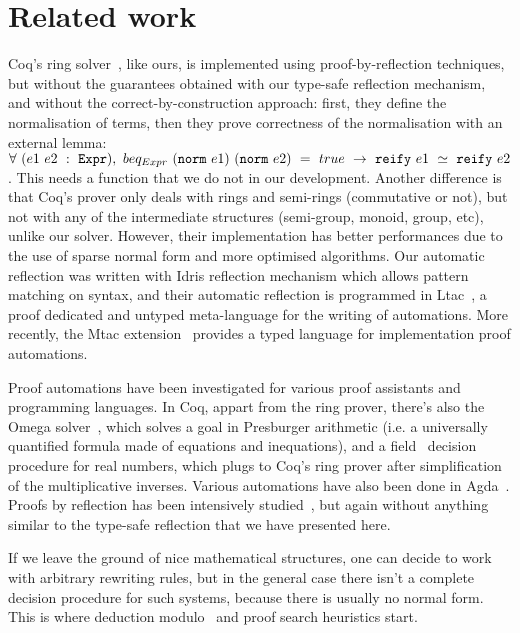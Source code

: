 \section{Related work}
\label{sect:relatedWork}

Coq's ring solver~\cite{Coq2005}, like ours, is
implemented using proof-by-reflection techniques, but without the guarantees obtained with
our type-safe reflection mechanism, and without the correct-by-construction
approach: first, they define the normalisation of terms, then
they prove correctness of the normalisation with an external lemma:
$\forall\ (e1\ e2\ :\ \code{Expr}),\ beq_{Expr}\ (\code{norm}\ e1)\
(\code{norm}\ e2)\ =\ true\ \rightarrow\ \ e1\ \simeq\
\code{reify}\ e2$.
This needs a \code{reify} function that we do not
in our development. Another difference is that Coq's prover only deals
with rings and semi-rings (commutative or not), but not with any of the
intermediate structures (semi-group, monoid, group, etc), unlike our solver. 
However,
their implementation has better performances due to the use of sparse normal
form and more optimised algorithms.  Our automatic reflection was written with
Idris reflection mechanism which allows pattern matching on syntax, and
their automatic reflection is programmed in Ltac~\cite{DelahayeLTac}, a proof
dedicated and untyped meta-language for the writing of automations.
More recently, the Mtac extension~\cite{Ziliani13} provides a
typed language for implementation proof automations.

Proof automations have been investigated for various proof assistants and
programming languages. In Coq, appart from the ring prover, there's also the
Omega solver~\cite{Cregut04}, which solves a goal in Presburger arithmetic
(i.e. a universally quantified formula made of equations and inequations), and
a field~\cite{DelahayeField} decision procedure for real numbers, which plugs
to Coq's ring prover after simplification of the multiplicative inverses.
Various automations have also been done in
Agda~\cite{DBLP:conf/mpc/KokkeS15,Lindblad04}.
%
Proofs by reflection has been intensively
studied~\cite{ChlipalaBook,Malecha14}, but again without anything similar to
the type-safe reflection that we have presented here.

If we leave the ground of nice mathematical structures, one can decide
to work with arbitrary rewriting rules, but in the general case there isn't a
complete decision procedure for such systems, because there is usually no
normal form. This is where deduction modulo~\cite{Dowek03,DelahayeModulo} and
proof search heuristics start.
